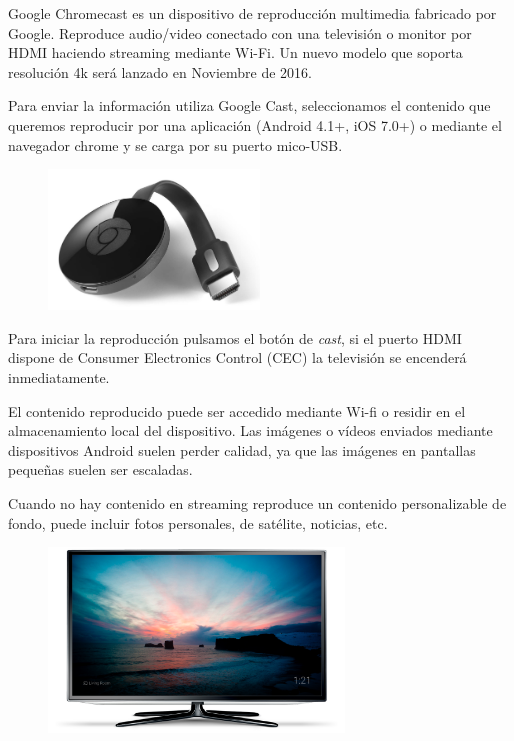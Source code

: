 Google Chromecast es un dispositivo de reproducción multimedia fabricado por Google. Reproduce audio/video conectado con una televisión o monitor por HDMI haciendo streaming mediante Wi-Fi. Un nuevo modelo que soporta resolución 4k será lanzado en Noviembre de 2016.

Para enviar la información utiliza Google Cast, seleccionamos el contenido que queremos reproducir por una aplicación (Android 4.1+, iOS 7.0+) o mediante el navegador chrome y se carga por su puerto mico-USB.

\begin{figure}[h]
	\centering
	\includegraphics[width=0.5\textwidth]{./Memoria/Imagenes/Chromecast.jpg}
	\label{fig:chromecast}
\end{figure}

Para iniciar la reproducción pulsamos el botón de \textit{cast}, si el puerto HDMI dispone de Consumer Electronics Control (CEC) la televisión se encenderá inmediatamente.

El contenido reproducido puede ser accedido mediante Wi-fi o residir en el almacenamiento local del dispositivo.
Las imágenes o vídeos enviados mediante dispositivos Android suelen perder calidad, ya que las imágenes en pantallas pequeñas suelen ser escaladas.

Cuando no hay contenido en streaming reproduce un contenido personalizable de fondo, puede incluir fotos personales, de satélite, noticias, etc.

\begin{figure}[h]
	\centering
	\includegraphics[width=0.7\textwidth]{./Memoria/Imagenes/fondo.png}
	\label{fig:fondo}
\end{figure}

